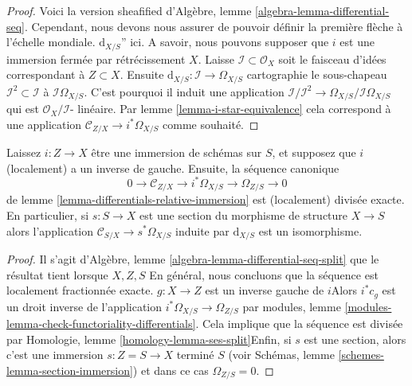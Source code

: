 \begin{proof}

Voici la version sheafified d'Algèbre, lemme \ref{algebra-lemma-differential-seq}. Cependant, nous devons nous assurer de pouvoir définir la première flèche à l'échelle mondiale. $\text{d}_{X/S}$'' ici. A savoir, nous pouvons supposer que $i$ est une immersion fermée par rétrécissement $X$. Laisse $\mathcal{I} \subset \mathcal{O}_X$
soit le faisceau d'idées correspondant à $Z \subset X$. Ensuite $\text{d}_{X/S} : \mathcal{I} \to \Omega_{X/S}$
cartographie le sous-chapeau $\mathcal{I}^2 \subset \mathcal{I}$ à
$\mathcal{I}\Omega_{X/S}$. C'est pourquoi il induit une application
$\mathcal{I}/\mathcal{I}^2 \to \Omega_{X/S}/\mathcal{I}\Omega_{X/S}$
qui est $\mathcal{O}_X/\mathcal{I}$- linéaire. Par lemme \ref{lemma-i-star-equivalence} cela correspond à une application
$\mathcal{C}_{Z/X} \to i^*\Omega_{X/S}$ comme souhaité.

\end{proof}

\begin{lemma}

\label{lemma-differentials-relative-immersion-section}
Laissez $i : Z \to X$ être une immersion de schémas sur $S$, et supposez que $i$ (localement) a un inverse de gauche. Ensuite, la séquence canonique $$
0 \to \mathcal{C}_{Z/X} \to i^*\Omega_{X/S} \to \Omega_{Z/S} \to 0
$$ de lemme \ref{lemma-differentials-relative-immersion} est (localement) divisée exacte. En particulier, si $s : S \to X$ est une section du morphisme de structure $X \to S$ alors l'application $\mathcal{C}_{S/X} \to s^*\Omega_{X/S}$ induite par $\text{d}_{X/S}$ est un isomorphisme.
\end{lemma}

\begin{proof}

Il s'agit d'Algèbre, lemme \ref{algebra-lemma-differential-seq-split}
que le résultat tient lorsque $X, Z, S$ En général, nous concluons que la séquence est localement fractionnée exacte. $g : X \to Z$ est un inverse gauche de $i$Alors $i^*c_g$ est un droit inverse de l'application
$i^*\Omega_{X/S} \to \Omega_{Z/S}$ par modules, lemme \ref{modules-lemma-check-functoriality-differentials}. Cela implique que la séquence est divisée par Homologie, lemme \ref{homology-lemma-ses-split}Enfin, si $s$ est une section, alors c'est une immersion $s : Z = S \to X$
terminé $S$ (voir Schémas, lemme \ref{schemes-lemma-section-immersion}) et dans ce cas $\Omega_{Z/S} = 0$.

\end{proof}

